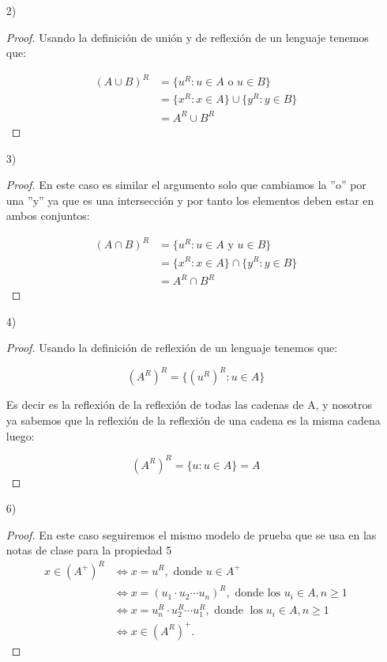 \begin{itemize}
    \item[2)]
    \begin{proof}
        Usando la definición de unión y de reflexión de un lenguaje tenemos que:

\begin{align*}
    (A \cup B)^R&=\{u^R: u \in A \text{ o } u\in B\}\\
    &=\{x^R: x\in A\}\cup\{y^R: y \in B\}\\
    &=A^R\cup B^R
\end{align*}  
    \end{proof}

    \item[3)] 

    \begin{proof}
        En este caso es similar el argumento solo que cambiamos la ''o'' por una ''y'' ya que es una intersección y por tanto los elementos deben estar en ambos conjuntos:

        \begin{align*}
              (A \cap B)^R&=\{u^R: u \in A \text{ y } u\in B\}\\
    &=\{x^R: x\in A\}\cap\{y^R: y \in B\}\\
    &=A^R\cap B^R
        \end{align*}
    \end{proof}

    \item[4)]\begin{proof}
        Usando la definición de reflexión de un lenguaje tenemos que:

        $$(A^R)^R=\{(u^R)^R:u\in A\}$$

        Es decir es la reflexión de la reflexión de todas las cadenas de A, y nosotros ya sabemos que la reflexión de la reflexión de una cadena es la misma cadena luego:

        $$(A^R)^R=\{u: u \in A\}=A$$

    \end{proof}

     \item[6)] 
   \begin{proof}En este caso seguiremos el mismo modelo de prueba que se usa en las notas de clase para la propiedad 5
        $$
    \begin{aligned}
    x \in\left(A^+\right)^R & \Longleftrightarrow x=u^R, \text { donde } u \in A^+ \\
    & \Longleftrightarrow x=\left(u_1 \cdot u_2 \cdots u_n\right)^R, \text { donde los } u_i \in A, n \geq 1 \\
    & \Longleftrightarrow x=u_n^R \cdot u_2^R \cdots u_1^R, \text { donde } \operatorname{los} u_i \in A, n \geq 1 \\
    & \Longleftrightarrow x \in\left(A^R\right)^+ .
    \end{aligned}
    $$
   \end{proof}
\end{itemize}

